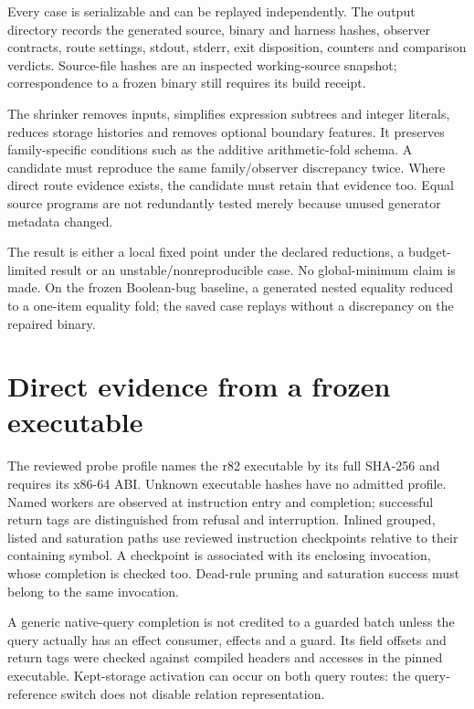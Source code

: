 \documentclass[11pt,a4paper]{article}
\begin{document}
Every case is serializable and can be replayed independently. The output
directory records the generated source, binary and harness hashes, observer
contracts, route settings, stdout, stderr, exit disposition, counters and
comparison verdicts. Source-file hashes are an inspected working-source
snapshot; correspondence to a frozen binary still requires its build receipt.

The shrinker removes inputs, simplifies expression subtrees and integer
literals, reduces storage histories and removes optional boundary features.
It preserves family-specific
conditions such as the additive arithmetic-fold schema. A candidate must
reproduce the same family/observer discrepancy twice. Where direct route
evidence exists, the candidate must retain that evidence too. Equal source
programs are not redundantly tested merely because unused generator metadata
changed.

The result is either a local fixed point under the declared reductions, a
budget-limited result or an unstable/nonreproducible case. No global-minimum
claim is made. On the frozen Boolean-bug baseline, a generated nested equality
reduced to a one-item equality fold; the saved case replays without a
discrepancy on the repaired binary.

\section{Direct evidence from a frozen executable}

The reviewed probe profile names the r82 executable by its full SHA-256 and
requires its x86-64 ABI. Unknown executable hashes have no admitted profile.
Named workers are observed at instruction entry and completion; successful
return tags are distinguished from refusal and interruption. Inlined grouped,
listed and saturation paths use reviewed instruction checkpoints relative to
their containing symbol. A checkpoint is associated with its enclosing
invocation, whose completion is checked too. Dead-rule pruning and saturation
success must belong to the same invocation.

A generic native-query completion is not credited to a guarded batch unless
the query actually has an effect consumer, effects and a guard. Its field
offsets and return tags were checked against compiled headers and accesses in
the pinned executable. Kept-storage activation can occur on both query routes:
the query-reference switch does not disable relation representation.
\end{document}
